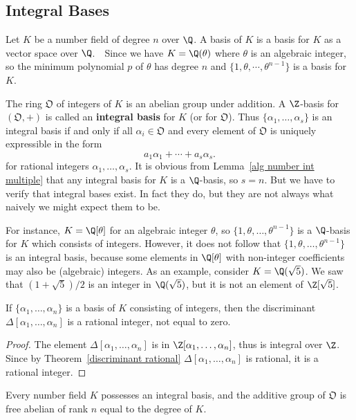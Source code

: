 \subsection{Integral Bases}
Let $K$ be a number field of degree $n$ over $\Q$. A basis of $K$ is a basis for $K$ as a vector space over $\Q$.　Since we have $K=\Q(\theta)$ where $\theta$ is an algebraic integer, so the minimum polynomial $p$ of $\theta$ has degree $n$ and $\{1,\theta,\cdots,\theta^{n-1}\}$ is a basis for $K$.\par
The ring $\mathfrak{O}$ of integers of $K$ is an abelian group under addition. A $\Z$-basis for $(\mathfrak{O},+)$ is called an \textbf{integral basis} for $K$ (or for $\mathfrak{O}$). Thus $\{\alpha_1,\dots,\alpha_s\}$ is an integral basis if and only if all $\alpha_i\in\mathfrak{O}$ and every element of $\mathfrak{O}$ is uniquely expressible in the form
\[a_1\alpha_1+\cdots+a_s\alpha_s.\]
for rational integers $\alpha_1,\dots,\alpha_s$. It is obvious from Lemma~\ref{alg number int multiple} that any integral basis for $K$ is a $\Q$-basis, so $s=n$. But we have to verify that integral bases exist. In fact they do, but they are not always what naively we might expect them to be.
\begin{example}
For instance, $K=\Q[\theta]$ for an algebraic integer $\theta$, so $\{1,\theta,\dots,\theta^{n-1}\}$ is a $\Q$-basis for $K$ which consists of integers. However, it does not follow that $\{1,\theta,\dots,\theta^{n-1}\}$ is an integral basis, because some elements in $\Q[\theta]$ with non-integer coefficients may also be (algebraic) integers. As an example, consider $K=\Q(\sqrt{5})$. We saw that $(1+\sqrt{5})/2$ is an integer in $\Q(\sqrt{5})$, but it is not an element of $\Z[\sqrt{5}]$.
\end{example}
\begin{lemma}
If $\{\alpha_1,\dots,\alpha_n\}$ is a basis of $K$ consisting of integers, then the discriminant $\Delta[\alpha_1,\dots,\alpha_n]$ is a rational integer, not equal to zero.
\end{lemma}
\begin{proof}
The element $\Delta[\alpha_1,\dots,\alpha_n]$ is in $\Z[\alpha_1,\dots,\alpha_n]$, thus is integral over $\Z$. Since by Theorem~\ref{discriminant rational} $\Delta[\alpha_1,\dots,\alpha_n]$ is rational, it is a rational integer.
\end{proof}
\begin{theorem}\label{int basis rank}
Every number field $K$ possesses an integral basis, and the additive group of $\mathfrak{O}$ is free abelian of rank $n$ equal to the degree of $K$.
\end{theorem}
